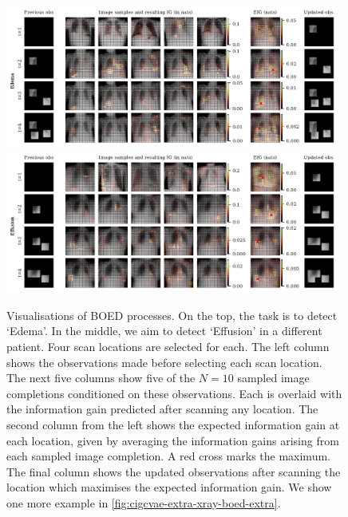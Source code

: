 \begin{figure}[t]
  \centering
  \includegraphics[width=0.98\textwidth]{figs/cigcvae/boed-visualisation-4960-compressed.pdf}
  \includegraphics[width=0.98\textwidth]{figs/cigcvae/boed-visualisation-4970-compressed.pdf}
  \caption{Visualisations of BOED processes. On the top, the task is to detect
    `Edema'. In the middle, we aim to detect `Effusion' in a different patient.
    Four scan locations are
    selected for each. The left column shows the observations made before
    selecting each scan location. The next five columns show five of the $N=10$
    sampled image completions conditioned on these observations. Each is
    overlaid with the information gain predicted after scanning any location.
    The second column from the left shows the expected information gain at each
    location, given by averaging the information gains arising from each sampled
    image completion. A red cross marks the maximum. The final column shows the
    updated observations after scanning the location which maximises the
    expected information gain. We show one more example in \cref{fig:cigcvae-extra-xray-boed-extra}.}
  \label{fig:cigcvae-extra-xray-boed}
\end{figure}

